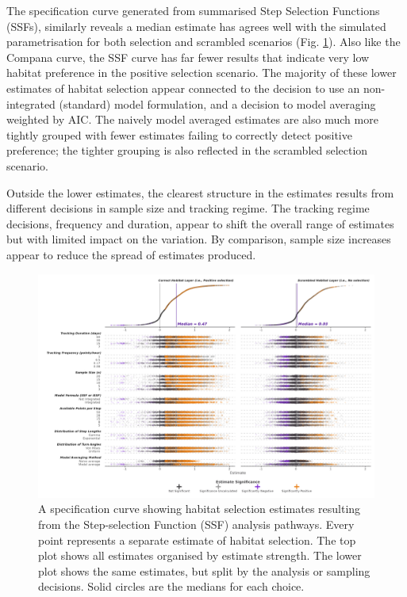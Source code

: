 \documentclass[10pt,a4paper]{article}
\begin{document}
The specification curve generated from summarised Step Selection Functions (SSFs), similarly reveals a median estimate has agrees well with the simulated parametrisation for both selection and scrambled scenarios (Fig. \ref{fig:specCurveSSF}).
Also like the Compana curve, the SSF curve has far fewer results that indicate very low habitat preference in the positive selection scenario.
The majority of these lower estimates of habitat selection appear connected to the decision to use an non-integrated (standard) model formulation, and a decision to model averaging weighted by AIC.
The naively model averaged estimates are also much more tightly grouped with fewer estimates failing to correctly detect positive preference; the tighter grouping is also reflected in the scrambled selection scenario.

Outside the lower estimates, the clearest structure in the estimates results from different decisions in sample size and tracking regime.
The tracking regime decisions, frequency and duration, appear to shift the overall range of estimates but with limited impact on the variation.
By comparison, sample size increases appear to reduce the spread of estimates produced.

\begin{figure}
\includegraphics[width=1\linewidth]{../figures/ssf_specCurve} \caption{A specification curve showing habitat selection estimates resulting from the Step-selection Function (SSF) analysis pathways. Every point represents a separate estimate of habitat selection. The top plot shows all estimates organised by estimate strength. The lower plot shows the same estimates, but split by the analysis or sampling decisions. Solid circles are the medians for each choice.}\label{fig:specCurveSSF}
\end{figure}
\end{document}
